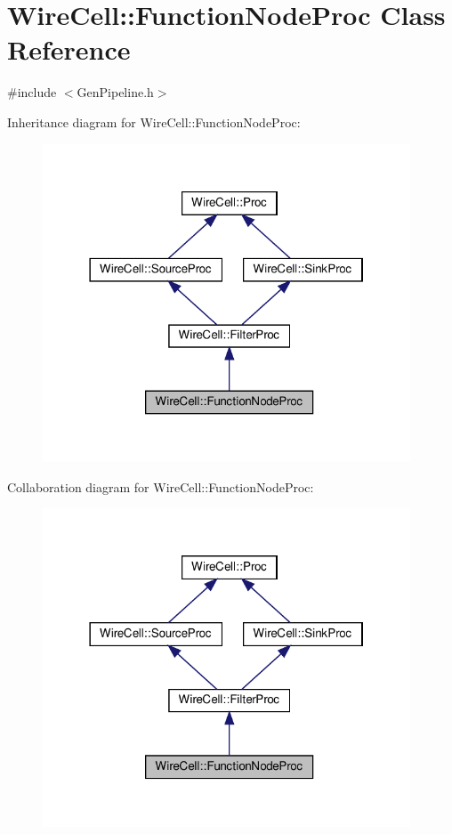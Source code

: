 \hypertarget{class_wire_cell_1_1_function_node_proc}{}\section{Wire\+Cell\+:\+:Function\+Node\+Proc Class Reference}
\label{class_wire_cell_1_1_function_node_proc}


{\ttfamily \#include $<$Gen\+Pipeline.\+h$>$}



Inheritance diagram for Wire\+Cell\+:\+:Function\+Node\+Proc\+:
\nopagebreak
\begin{figure}[H]
\begin{center}
\leavevmode
\includegraphics[width=310pt]{class_wire_cell_1_1_function_node_proc__inherit__graph}
\end{center}
\end{figure}


Collaboration diagram for Wire\+Cell\+:\+:Function\+Node\+Proc\+:
\nopagebreak
\begin{figure}[H]
\begin{center}
\leavevmode
\includegraphics[width=310pt]{class_wire_cell_1_1_function_node_proc__coll__graph}
\end{center}
\end{figure}
